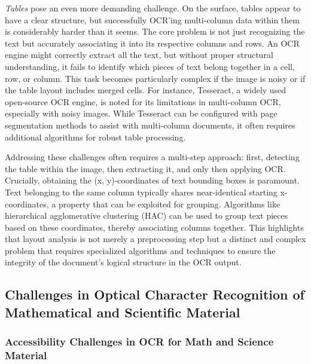 \emph{Tables} pose an even more demanding challenge. On the surface, tables appear to have a clear structure, but successfully OCR'ing multi-column data within them is considerably harder than it seems. \cite{PyImageSearchTables} The core problem is not just recognizing the text but accurately associating it into its respective columns and rows. \cite{PyImageSearchTables} An OCR engine might correctly extract all the text, but without proper structural understanding, it fails to identify which pieces of text belong together in a cell, row, or column. \cite{PyImageSearchTables} This task becomes particularly complex if the image is noisy or if the table layout includes merged cells. \cite{PyImageSearchTables} \cite{UWDocInfo} For instance, Tesseract, a widely used open-source OCR engine, is noted for its limitations in multi-column OCR, especially with noisy images. \cite{PyImageSearchTables} While Tesseract can be configured with page segmentation methods to assist with multi-column documents, it often requires additional algorithms for robust table processing. \cite{StackOverflowTesseractColumns}

Addressing these challenges often requires a multi-step approach: first, detecting the table within the image, then extracting it, and only then applying OCR. \cite{PyImageSearchTables} Crucially, obtaining the (x, y)-coordinates of text bounding boxes is paramount. Text belonging to the same column typically shares near-identical starting x-coordinates, a property that can be exploited for grouping. \cite{PyImageSearchTables} Algorithms like hierarchical agglomerative clustering (HAC) can be used to group text pieces based on these coordinates, thereby associating columns together. \cite{PyImageSearchTables} This highlights that layout analysis is not merely a preprocessing step but a distinct and complex problem that requires specialized algorithms and techniques to ensure the integrity of the document's logical structure in the OCR output.

\subsection{Challenges in Optical Character Recognition of Mathematical and Scientific Material}

\subsubsection{Accessibility Challenges in OCR for Math and Science Material}

